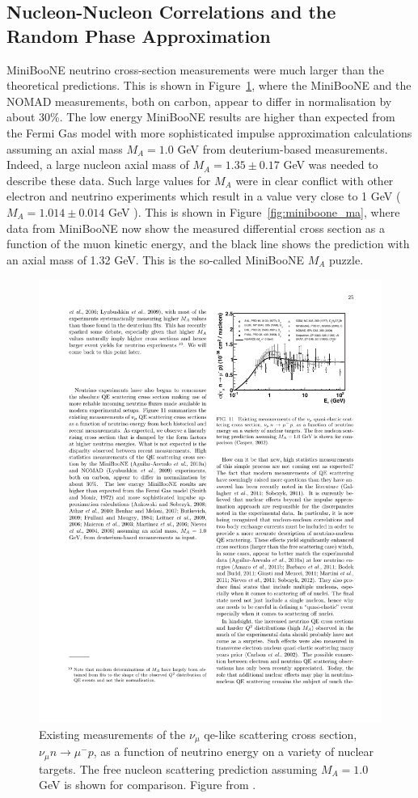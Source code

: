 \subsection{Nucleon-Nucleon Correlations and the Random Phase Approximation}
\label{sec:rpa}

MiniBooNE neutrino cross-section measurements \cite{miniboone} were much larger than the theoretical predictions. This is shown in Figure~\ref{fig:numu_xsec}, where the MiniBooNE and the NOMAD measurements, both on carbon, appear to differ in normalisation by about 30\%. The low energy MiniBooNE results are higher than expected from the Fermi Gas model with more sophisticated impulse approximation calculations assuming an axial mass $M_A = 1.0$ GeV from deuterium-based measurements. Indeed, a large nucleon axial mass of $M_A = 1.35\pm0.17$ GeV was needed to describe these data. Such large values for $M_A$ were in clear conflict with other electron and neutrino experiments which result in a value very close to 1 GeV ($M_A = 1.014 \pm 0.014$ GeV \cite{ma_bodek}). This is shown in Figure~\ref{fig:miniboone_ma}, where data from MiniBooNE now show the measured differential cross section as a function of the muon kinetic energy, and the black line shows the prediction with an axial mass of 1.32 GeV. This is the so-called MiniBooNE $M_A$ puzzle. 

\begin{figure}[]
\centering
\includegraphics[width=.7\textwidth]{images/NeutrinoInteractions/numu_xsec}
\caption[Existing Measurements of the $\nu_\mu$ Quasi-Elastic-Like Scattering]{Existing measurements of the $\nu_\mu$ \acrshort{qe}-like scattering cross section, $\nu_\mu n\rightarrow\mu^-p$, as a function of neutrino energy on a variety of nuclear targets. The free nucleon scattering prediction assuming $M_A = 1.0$ GeV is shown for comparison. Figure from \cite{zeller}.}
\label{fig:numu_xsec}
\end{figure}

